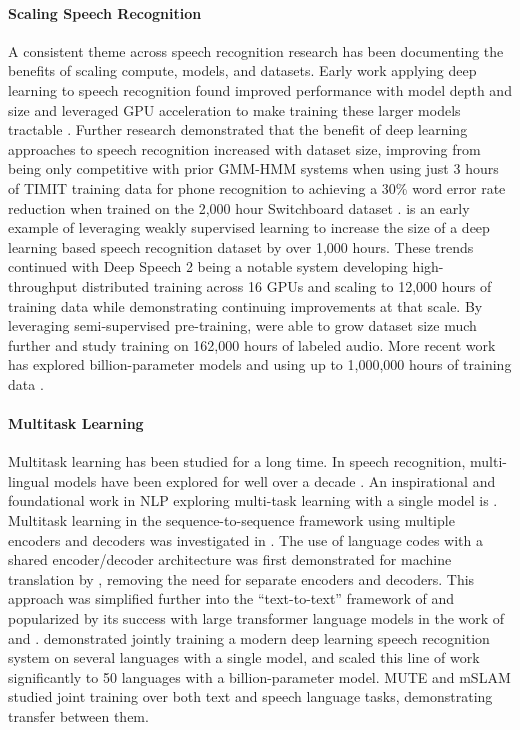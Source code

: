 \paragraph{Scaling Speech Recognition} A consistent theme across speech recognition research has been documenting the benefits of scaling compute, models, and datasets. Early work applying deep learning to speech recognition found improved performance with model depth and size and leveraged GPU acceleration to make training these larger models tractable \cite{mohamed2009deep}. Further research demonstrated that the benefit of deep learning approaches to speech recognition increased with dataset size, improving from being only competitive with prior GMM-HMM systems when using just 3 hours of TIMIT training data for phone recognition to achieving a 30\% word error rate reduction when trained on the 2,000 hour Switchboard dataset \cite{seide2011feature}. \citet{liao2013large} is an early example of leveraging weakly supervised learning to increase the size of a deep learning based speech recognition dataset by over 1,000 hours. These trends continued with Deep Speech 2 \cite{amodei2015deepspeech2} being a notable system developing high-throughput distributed training across 16 GPUs and scaling to 12,000 hours of training data while demonstrating continuing improvements at that scale. By leveraging semi-supervised pre-training, \citet{narayanan2018toward} were able to grow dataset size much further and study training on 162,000 hours of labeled audio. More recent work has explored billion-parameter models \cite{zhang2020pushing} and using up to 1,000,000 hours of training data \cite{zhang2021bigssl}.

\paragraph{Multitask Learning} Multitask learning \cite{caruana1997multitask} has been studied for a long time. In speech recognition, multi-lingual models have been explored for well over a decade \cite{schultz2006multilingual}. An inspirational and foundational work in NLP exploring multi-task learning with a single model is \citet{collobert2011natural}. Multitask learning in the sequence-to-sequence framework \cite{sutskever2014sequence} using multiple encoders and decoders was investigated in \citet{luong2015multi}. The use of language codes with a shared encoder/decoder architecture was first demonstrated for machine translation by \citet{johnson2017google}, removing the need for separate encoders and decoders. This approach was simplified further into the ``text-to-text'' framework of \citet{mccann2018natural} and popularized by its success with large transformer language models in the work of \citet{radford2019gpt2} and \citet{raffel2020exploring}. \citet{Toshniwal2018MultilingualSR} demonstrated jointly training a modern deep learning speech recognition system on several languages with a single model, and \citet{Pratap2020MassivelyMA} scaled this line of work significantly to 50 languages with a billion-parameter model. MUTE \cite{wang2020multitask} and mSLAM \cite{bapna2022mslam} studied joint training over both text and speech language tasks, demonstrating transfer between them.

